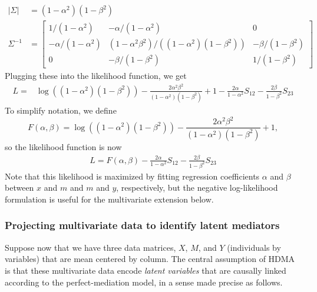 \documentclass[
]{article}
\begin{document}
\begin{align}
\left|\Sigma\right| &= (1-\alpha^2)(1-\beta^2) \\
\Sigma^{-1} &= 
  \begin{bmatrix}
1/(1-\alpha^2) & -\alpha/(1-\alpha^2) & 0 \\
-\alpha/(1-\alpha^2) & (1-\alpha^2\beta^2)/\left((1-\alpha^2)(1-\beta^2)\right) & -\beta/(1-\beta^2) \\
0 & -\beta/(1-\beta^2) & 1/(1-\beta^2)
\end{bmatrix}
\end{align} Plugging these into the likelihood function, we get
\begin{align}
\label{eqn:mediation_loglikelihood}
L = &\log\left((1-\alpha^2)(1-\beta^2)\right) - \frac{2\alpha^2\beta^2}{(1-\alpha^2)(1-\beta^2)} + 1 - \frac{2\alpha}{1-\alpha^2} S_{12} - \frac{2\beta}{1-\beta^2} S_{23}
\end{align} To simplify notation, we define \begin{equation}
F(\alpha,\beta) = \log\left((1-\alpha^2)(1-\beta^2)\right) - \frac{2\alpha^2\beta^2}{(1-\alpha^2)(1-\beta^2)} + 1,
\end{equation} so the likelihood function is now \begin{align}
\label{eqn:mediation_loglikelihood_simple}
L = F(\alpha, \beta) - \frac{2\alpha}{1-\alpha^2} S_{12} - \frac{2\beta}{1-\beta^2} S_{23}
\end{align} Note that this likelihood is maximized by fitting regression
coefficients \(\alpha\) and \(\beta\) between \(x\) and \(m\) and \(m\)
and \(y\), respectively, but the negative log-likelihood formulation is
useful for the multivariate extension below.

\subsubsection{Projecting multivariate data to identify latent
mediators}\label{projecting-multivariate-data-to-identify-latent-mediators}

Suppose now that we have three data matrices, \(X\), \(M\), and \(Y\)
(individuals by variables) that are mean centered by column. The central
assumption of HDMA is that these multivariate data encode
\textit{latent variables} that are causally linked according to the
perfect-mediation model, in a sense made precise as follows.
\end{document}
